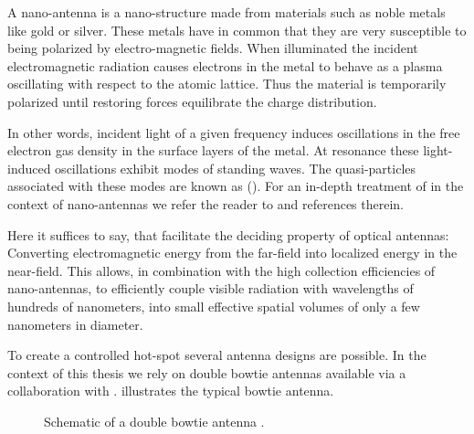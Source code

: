 		A nano-antenna is a nano-structure made from materials such as noble metals like gold or silver. These metals have in common that they are very susceptible to being polarized by electro-magnetic fields. When illuminated the incident electromagnetic radiation causes electrons in the metal to behave as a plasma oscillating with respect to the atomic lattice. Thus the material is temporarily polarized until restoring forces equilibrate the charge distribution.
		
		In other words, incident light of a given frequency induces oscillations in the free electron gas density in the surface layers of the metal. At resonance these light-induced oscillations exhibit modes of standing waves. The quasi-particles associated with these modes are known as \lsps (\LSPs).
		For an in-depth treatment of \LSPs in the context of nano-antennas we refer the reader to \cite{rahbany2016towards} and references therein.
		
		Here it suffices to say, that \LSPs facilitate the deciding property of optical antennas: Converting electromagnetic energy from the far-field into localized energy in the near-field. This allows, in combination with the high collection efficiencies of nano-antennas, to efficiently couple visible radiation with wavelengths of hundreds of nanometers, into small effective spatial volumes of only a few nanometers in diameter.
		
		To create a controlled hot-spot several antenna designs are possible. In the context of this thesis we rely on double bowtie antennas available via a collaboration with \nancy.  illustrates the typical bowtie antenna.

		\begin{figure}[thp]
				\centering
				\caption[Schematic of a double bowtie antenna]{Schematic of a double bowtie antenna \cite{rahbany2016towards, Rahbany2015, rahbany2016towards}.}
				\label{fig::double_bowtie_antenna_schematic}
		\end{figure}

